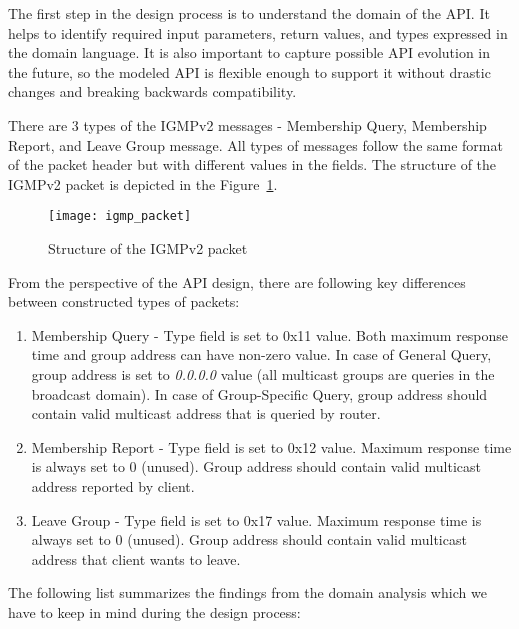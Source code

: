 The first step in the design process is to understand the domain of the API. It helps to identify required
input parameters, return values, and types expressed in the domain language.
It is also important to capture possible API evolution in the future, so the modeled API is flexible enough
to support it without drastic changes and breaking backwards compatibility.

There are 3 types of the IGMPv2 messages - Membership Query, Membership Report, and Leave Group message.
All types of messages follow the same format of the packet header but with different values in the fields.
The structure of the IGMPv2 packet is depicted in the Figure~\ref{fig:igmp_packet}.

\begin{figure}[!htb]
\centering
\texttt{[image: igmp\_packet]}
\caption{Structure of the IGMPv2 packet}
\label{fig:igmp_packet}
\end{figure}

From the perspective of the API design, there are following key differences between constructed types of packets:

\begin{enumerate}
    \item Membership Query - Type field is set to 0x11 value.
    Both maximum response time and group address can have non-zero value.
    In case of General Query, group address is set to \textit{0.0.0.0} value (all multicast groups are queries
    in the broadcast domain).
    In case of Group-Specific Query, group address should contain valid multicast address that is queried by router.
    \item Membership Report - Type field is set to 0x12 value.
    Maximum response time is always set to 0 (unused).
    Group address should contain valid multicast address reported by client.
    \item Leave Group - Type field is set to 0x17 value.
    Maximum response time is always set to 0 (unused).
    Group address should contain valid multicast address that client wants to leave.
\end{enumerate}

The following list summarizes the findings from the domain analysis which we have to keep in mind during
the design process:

